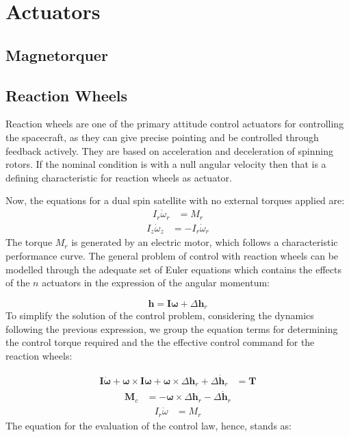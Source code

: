 \section{Actuators}
\label{actuators}
\subsection{Magnetorquer}
\label{magnetorquer}
\cite{magnetorquer_site}

\subsection{Reaction Wheels}
\label{reac_wheel}
Reaction wheels are one of the primary attitude control actuators for controlling the spacecraft, as they can give precise pointing and be controlled through feedback actively. They are based on acceleration and deceleration of spinning rotors. If the nominal condition is with a null angular velocity then that is a defining characteristic for reaction wheels as actuator.

Now, the equations for a dual spin satellite with no external torques applied are:
     \begin{align*}
		  I_{r}\dot{\omega}_{r} &= M_{r}
     \end{align*}
     \begin{align*}
	    I_{z}\dot{\omega}_{z} &= -I_{r}\dot{\omega}_{r}
     \end{align*}
The torque \( M_{r} \) is generated by an electric motor, which follows a characteristic performance curve. The general problem of control with reaction wheels can be modelled through the adequate set of Euler equations which contains the effects of the \( n \) actuators in the expression of the angular momentum:

    \begin{equation*}
		\mathbf{h} = \boldsymbol{I} \boldsymbol{\omega} + \Delta \mathbf{h}_r
    \end{equation*}	
To simplify the solution of the control problem, considering the dynamics following the previous expression, we group the equation terms for determining the control torque required and the the effective control command for the reaction wheels:

	\begin{align*}
	\boldsymbol{I} \dot{\boldsymbol{\omega}} + \boldsymbol{\omega} \times \boldsymbol{I} \boldsymbol{\omega} + \boldsymbol{\omega} \times \Delta \mathbf{h}_r + \Delta \dot{\mathbf{h}}_r &= \mathbf{T} 
	\end{align*}
	\begin{align*}
		\mathbf{M}_c &= -\boldsymbol{\omega} \times \Delta \mathbf{h}_r - \Delta \dot{\mathbf{h}}_r
	\end{align*}
	\begin{align*}
			I_r \dot{{\omega}} &= {M}_r 
	\end{align*}
The equation for the evaluation of the control law, hence, stands as:
	
